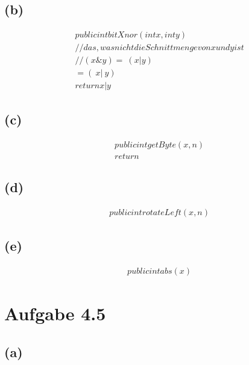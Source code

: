 \documentclass[12pt]{article}
\begin{document}
\subsection{(b)}
\begin{align}
&public int bitXnor(int x,int y)\\
&// das, was nicht die Schnittmenge von x und y ist\\
&// (x\& y)  = ~ (x | y)\\
&= (~ x | ~ y)\\
&return x | y
\end{align}

\subsection{(c)}
\begin{align}
&public int getByte(x,n)\\
&return
\end{align}
\subsection{(d)}
\begin{align}
&public int rotateLeft(x,n)
\end{align}
\subsection{(e)}
\begin{align}
&public int abs(x)
\end{align}


\section{Aufgabe 4.5}
\subsection{(a)}
\begin{align}
\end{align}
\end{document}

